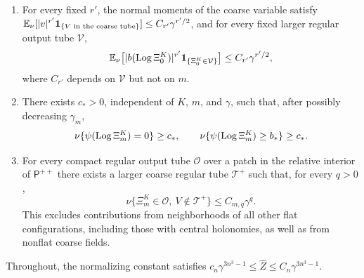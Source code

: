 \begin{theorem}
\begin{enumerate}
\begin{equation}
\end{equation}
Only values in the support of $w^+$ are used on the right.
\item For every fixed $r'$, the normal moments of the coarse variable satisfy $\mathbb E_\nu[\lvert v\rvert^{r'}\mathbf 1_{\{V\text{ in the coarse tube}\}}]\le C_{r'}\gamma^{r'/2}$, and for every fixed larger regular output tube $\mathcal V$,
\[
 \mathbb E_\nu\bigl[\lvert b(\operatorname{Log}\Xi_0^K)\rvert^{r'}\mathbf 1_{\{\Xi_0^K\in\mathcal V\}}\bigr]\le C_{r'}\gamma^{r'/2},
\]
where $C_{r'}$ depends on $\mathcal V$ but not on $m$.
\item There exists $c_*>0$, independent of $K$, $m$, and $\gamma$, such that, after possibly decreasing $\gamma_m$,
\[
 \nu\{\psi(\operatorname{Log}\Xi_m^K)=0\}\ge c_*,\qquad\nu\{\psi(\operatorname{Log}\Xi_m^K)\ge b_*\}\ge c_*.
\]
\item For every compact regular output tube $\mathcal O$ over a patch in the relative interior of $\mathsf P^{++}$ there exists a larger coarse regular tube $\mathcal T^+$ such that, for every $q>0$,
\[
 \nu\{\Xi_m^K\in\mathcal O,\ V\notin\mathcal T^+\}\le C_{m,q}\gamma^q.
\]
This excludes contributions from neighborhoods of all other flat configurations, including those with central holonomies, as well as from nonflat coarse fields.
\end{enumerate}
Throughout, the normalizing constant satisfies $c_n\gamma^{3n^3-1}\le\widehat Z\le C_n\gamma^{3n^3-1}$.
\end{theorem}


